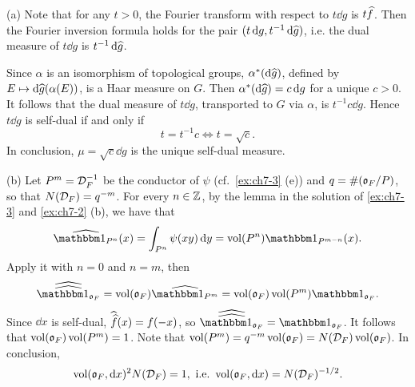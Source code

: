 \begin{solution}
  (a) Note that for any $t > 0$, the Fourier transform with respect to $t \dd g$ is $t \widehat{f}$.
  Then the Fourier inversion formula holds for the pair $(t \mathop{}\!\mathrm{d} g, t^{-1} \mathop{}\!\mathrm{d} \widehat{g})$, i.e. the
  dual measure of $t \dd g$ is $t^{-1} \mathop{}\!\mathrm{d} \widehat{g}$.

  Since $\alpha$ is an isomorphism of topological groups, $\alpha^*(\mathop{}\!\mathrm{d} \widehat{g})$, defined by
  $E \mapsto \mathop{}\!\mathrm{d} \widehat{g}(\alpha(E))$, is a Haar measure on $G$. Then
  $\alpha^*(\mathop{}\!\mathrm{d} \widehat{g}) = c \mathop{}\!\mathrm{d} g$ for a unique $c > 0$. It follows that the dual measure of
  $t \dd g$, transported to $G$ via $\alpha$, is $t^{-1} c \dd g$. Hence $t \dd g$ is self-dual
  if and only if
  \[t = t^{-1} c \iff t = \sqrt{c}. \]
  In conclusion, $\mu = \sqrt{c} \dd g$ is the unique self-dual measure.

  (b) Let $P^m = \mathcal{D}_F^{-1}$ be the conductor of $\psi$ (cf.\ \cref{ex:ch7-3} (e)) and
  $q = \#(\mathfrak{o}_F/ P)$, so that $N(\mathcal{D}_F) = q^{-m}$. For every $n \in \mathbb{Z}$, by the lemma in the
  solution of \cref{ex:ch7-3} and \cref{ex:ch7-2} (b), we have that
  \[\dual{\bbone_{P^n}}(x) = \int_{P^n} \psi(xy) \dd y = \vol(P^n) \bbone_{P^{m-n}}(x). \]
  Apply it with $n = 0$ and $n = m$, then
  \[\dual{\dual{\bbone_{\gotho_F}}} = \vol(\gotho_F) \dual{\bbone_{P^m}}
  = \vol(\gotho_F) \vol(P^m) \bbone_{\gotho_F}. \]
  Since $\dd x$ is self-dual, $\widehat{\widehat{f}}(x) = f(-x)$, so
  $\dual{\dual{\bbone_{\gotho_F}}} = \bbone_{\gotho_F}$. It follows that
  $\operatorname{vol}(\mathfrak{o}_F) \operatorname{vol}(P^m) = 1$. Note that $\operatorname{vol}(P^m) = q^{-m} \operatorname{vol}(\mathfrak{o}_F) =
  N(\mathcal{D}_F) \operatorname{vol}(\mathfrak{o}_F)$. In conclusion,
  \[\vol(\gotho_F, \dd x)^2 N(\calD_F) = 1, \ \text{i.e.} \
  \vol(\gotho_F, \dd x) = N(\calD_F)^{-1/2}. \]
\end{solution}

